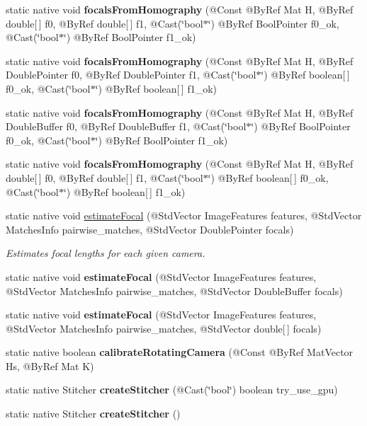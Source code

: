 \begin{DoxyCompactItemize}
\item 
static native void {\bfseries focals\+From\+Homography} (@Const @By\+Ref Mat H, @By\+Ref double\mbox{[}$\,$\mbox{]} f0, @By\+Ref double\mbox{[}$\,$\mbox{]} f1, @Cast(\char`\"{}bool$\ast$\char`\"{}) @By\+Ref Bool\+Pointer f0\+\_\+ok, @Cast(\char`\"{}bool$\ast$\char`\"{}) @By\+Ref Bool\+Pointer f1\+\_\+ok)
\item 
static native void {\bfseries focals\+From\+Homography} (@Const @By\+Ref Mat H, @By\+Ref Double\+Pointer f0, @By\+Ref Double\+Pointer f1, @Cast(\char`\"{}bool$\ast$\char`\"{}) @By\+Ref boolean\mbox{[}$\,$\mbox{]} f0\+\_\+ok, @Cast(\char`\"{}bool$\ast$\char`\"{}) @By\+Ref boolean\mbox{[}$\,$\mbox{]} f1\+\_\+ok)
\item 
static native void {\bfseries focals\+From\+Homography} (@Const @By\+Ref Mat H, @By\+Ref Double\+Buffer f0, @By\+Ref Double\+Buffer f1, @Cast(\char`\"{}bool$\ast$\char`\"{}) @By\+Ref Bool\+Pointer f0\+\_\+ok, @Cast(\char`\"{}bool$\ast$\char`\"{}) @By\+Ref Bool\+Pointer f1\+\_\+ok)
\item 
static native void {\bfseries focals\+From\+Homography} (@Const @By\+Ref Mat H, @By\+Ref double\mbox{[}$\,$\mbox{]} f0, @By\+Ref double\mbox{[}$\,$\mbox{]} f1, @Cast(\char`\"{}bool$\ast$\char`\"{}) @By\+Ref boolean\mbox{[}$\,$\mbox{]} f0\+\_\+ok, @Cast(\char`\"{}bool$\ast$\char`\"{}) @By\+Ref boolean\mbox{[}$\,$\mbox{]} f1\+\_\+ok)
\item 
static native void \hyperlink{group__stitching__autocalib_gab7c6c88fc60a136eb6f9faa46a32e660}{estimate\+Focal} (@Std\+Vector Image\+Features features, @Std\+Vector Matches\+Info pairwise\+\_\+matches, @Std\+Vector Double\+Pointer focals)
\begin{DoxyCompactList}\small\item\em Estimates focal lengths for each given camera. \end{DoxyCompactList}\item 
static native void {\bfseries estimate\+Focal} (@Std\+Vector Image\+Features features, @Std\+Vector Matches\+Info pairwise\+\_\+matches, @Std\+Vector Double\+Buffer focals)
\item 
static native void {\bfseries estimate\+Focal} (@Std\+Vector Image\+Features features, @Std\+Vector Matches\+Info pairwise\+\_\+matches, @Std\+Vector double\mbox{[}$\,$\mbox{]} focals)
\item 
static native boolean {\bfseries calibrate\+Rotating\+Camera} (@Const @By\+Ref Mat\+Vector Hs, @By\+Ref Mat K)
\item 
static native Stitcher {\bfseries create\+Stitcher} (@Cast(\char`\"{}bool\char`\"{}) boolean try\+\_\+use\+\_\+gpu)
\item 
static native Stitcher {\bfseries create\+Stitcher} ()
\end{DoxyCompactItemize}
